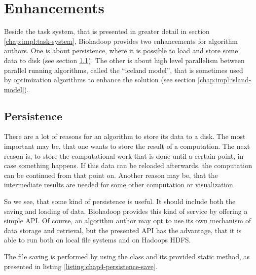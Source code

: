 \section{Enhancements}
\label{chap:impl:enhancements}
  Beside the task system, that is presented in greater detail in section \ref{chap:impl:task-system}, Biohadoop provides two enhancements for algorithm authors. One is about persistence, where it is possible to load and store some data to disk (see section \ref{chap:impl:persistence}). The other is about high level parallelism between parallel running algorithms, called the ``iceland model'', that is sometimes used by optimization algorithms to enhance the solution (see section \ref{chap:impl:island-model}).

  \subsection{Persistence}
  \label{chap:impl:persistence}
  There are a lot of reasons for an algorithm to store its data to a disk. The most important may be, that one wants to store the result of a computation. The next reason is, to store the computational work that is done until a certain point, in case something happens. If this data can be reloaded afterwards, the computation can be continued from that point on. Another reason may be, that the intermediate results are needed for some other computation or visualization.
  
  So we see, that some kind of persistence is useful. It should include both the saving and loading of data. Biohadoop provides this kind of service by offering a simple API. Of course, an algorithm author may opt to use its own mechanism of data storage and retrieval, but the presented API has the advantage, that it is able to run both on local file systems and on Hadoops HDFS.
  
  The file saving is performed by using the class  and its provided static method, as presented in listing \ref{listing:chap4-persistence-save}.
  
  
  
